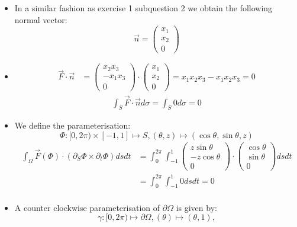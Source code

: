 \documentclass[11pt]{article}
\begin{document}
\begin{solution}     
    \begin{itemize}
     \item In a similar fashion as exercise 1 subquestion 2 we obtain the following normal vector:
		$$\vec{n} = \begin{pmatrix} x_1\\x_2\\0 \end{pmatrix}$$
     \item 
	\begin{align*}
	\vec F \cdot \vec n & = \begin{pmatrix}x_2x_3 \\ -x_1x_3\\0\end{pmatrix}\cdot \begin{pmatrix}x_1 \\ x_2\\0\end{pmatrix} = x_1x_2x_3 - x_1x_2x_3 = 0
	\end{align*}
	\begin{align*}
        \int_S \vec F \cdot \vec{n}d\sigma = \int_S 0 d\sigma = 0
     \end{align*}
     \item We define the parameterisation: 
	$$
	\Phi: [0,2\pi) \times [-1,1] \mapsto S, (\theta ,z) \mapsto (\cos\theta, \sin\theta ,z)
	$$
	\begin{align*}
        \int_\Omega \vec F(\Phi) \cdot ( \partial_S \Phi \times \partial_t \Phi ) dsdt &=\int_0^{2\pi} \int_{-1}^1 \begin{pmatrix}z\sin\theta\\ -z\cos\theta \\ 0\end{pmatrix} \cdot \begin{pmatrix}\cos\theta\\ \sin\theta \\ 0\end{pmatrix} dsdt \\
	& = \int_0^{2\pi} \int_{-1}^1 0  dsdt  = 0\\
     \end{align*}
     \item A counter clockwise parameterisation of $\partial \Omega$ is given by:
	$$
	\gamma: [0,2\pi) \mapsto \partial \Omega, (\theta) \mapsto (\theta, 1),
	$$


\end{itemize}
\end{solution}
\end{document}
